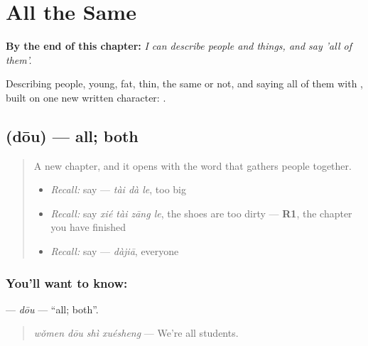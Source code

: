 
\chapter{All the Same}
\label{ch:zh-all-the-same}

\begin{chapteropening}
\textbf{By the end of this chapter:} \emph{I can describe people and things, and say 'all of them'.}

Describing people, young, fat, thin, the same or not, and saying all of them with , built on one new written character: .
\end{chapteropening}

\section[\texorpdfstring{\zh{都} (dōu)}{都 (dōu)}]{ (dōu) — all; both}

\label{lesson:ZH-C94-dou}



\begin{quote}
A new chapter, and it opens with the word that gathers people together.

\begin{itemize}
\raggedright
  \item \emph{Recall:} say  — \emph{tài dà le}, too big
  \item \emph{Recall:} say \emph{xié tài zāng le}, the shoes are too dirty — \textbf{R1}, the chapter you have finished
  \item \emph{Recall:} say  — \emph{dàjiā}, everyone
\end{itemize}
\end{quote}

\subsection*{You'll want to know: }
\textbf{} — \emph{dōu} — \textquotedblleft{}all; both\textquotedblright{}.

\begin{quote}
\textbf{} \emph{wǒmen dōu shì xuésheng} — We're all students.
\end{quote}

